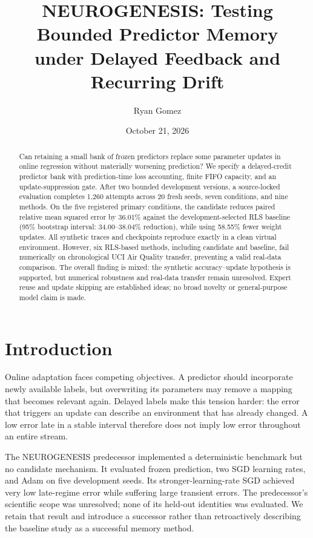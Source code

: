 \documentclass[10pt]{article}
\title{NEUROGENESIS: Testing Bounded Predictor Memory\\under Delayed Feedback and Recurring Drift}
\author{Ryan Gomez}
\date{October 21, 2026}
\begin{document}
\maketitle
\begin{abstract}
Can retaining a small bank of frozen predictors replace some parameter updates in online regression without materially worsening prediction? We specify a delayed-credit predictor bank with prediction-time loss accounting, finite FIFO capacity, and an update-suppression gate. After two bounded development versions, a source-locked evaluation completes 1,260 attempts across 20 fresh seeds, seven conditions, and nine methods. On the five registered primary conditions, the candidate reduces paired relative mean squared error by 36.01\% against the development-selected RLS baseline (95\% bootstrap interval: 34.00--38.04\% reduction), while using 58.55\% fewer weight updates. All synthetic traces and checkpoints reproduce exactly in a clean virtual environment. However, six RLS-based methods, including candidate and baseline, fail numerically on chronological UCI Air Quality transfer, preventing a valid real-data comparison. The overall finding is mixed: the synthetic accuracy--update hypothesis is supported, but numerical robustness and real-data transfer remain unresolved. Expert reuse and update skipping are established ideas; no broad novelty or general-purpose model claim is made.
\end{abstract}

\section{Introduction}
Online adaptation faces competing objectives. A predictor should incorporate newly available labels, but overwriting its parameters may remove a mapping that becomes relevant again. Delayed labels make this tension harder: the error that triggers an update can describe an environment that has already changed. A low error late in a stable interval therefore does not imply low error throughout an entire stream.

The NEUROGENESIS predecessor implemented a deterministic benchmark but no candidate mechanism. It evaluated frozen prediction, two SGD learning rates, and Adam on five development seeds. Its stronger-learning-rate SGD achieved very low late-regime error while suffering large transient errors. The predecessor's scientific scope was unresolved; none of its held-out identities was evaluated. We retain that result and introduce a successor rather than retroactively describing the baseline study as a successful memory method.
\end{document}
